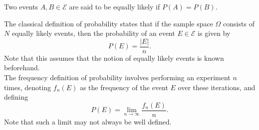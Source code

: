 \documentclass[11pt]{article}
\theoremstyle{definition}
\theoremstyle{remark}
\numberwithin{equation}{section}
\begin{document}
    \begin{definition}
        Two events $A, B \in \mathcal{E}$ are said to be equally likely if $P(A) =
        P(B)$.
    \end{definition}

    The classical definition of probability states that if the sample space
    $\Omega$ consists of $N$ equally likely events, then the probability of an
    event $E \in \mathcal{E}$ is given by \[
        P(E) = \frac{|E|}{n}.
    \] 
    Note that this assumes that the notion of equally likely events is known
    beforehand.\\

    The frequency definition of probability involves performing an experiment
    $n$ times, denoting $f_n(E)$ as the frequency of the event $E$ over these
    iterations, and defining \[
        P(E) = \lim_{n \to \infty} \frac{f_n(E)}{n}. 
    \] 
    Note that such a limit may not always be well defined.
\end{document}

